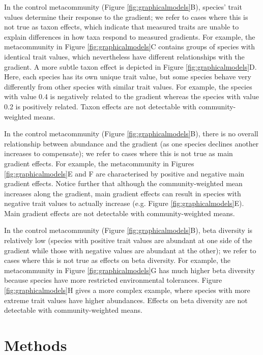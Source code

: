 \documentclass[12pt]{ecology}
\begin{document}
In the control metacommunity (Figure \ref{fig:graphicalmodels}B), species' trait values determine their response to the gradient; we refer to cases where this is not true as taxon effects, which indicate that measured traits are unable to explain differences in how taxa respond to measured gradients.  For example, the metacommunity in Figure \ref{fig:graphicalmodels}C contains groups of species with identical trait values, which nevertheless have different relationships with the gradient.  A more subtle taxon effect is depicted in Figure \ref{fig:graphicalmodels}D.  Here, each species has its own unique trait value, but some species behave very differently from other species with similar trait values.  For example, the species with value 0.4 is negatively related to the gradient whereas the species with value 0.2 is positively related.  Taxon effects are not detectable with community-weighted means.

In the control metacommunity (Figure \ref{fig:graphicalmodels}B), there is no overall relationship between abundance and the gradient (as one species declines another increases to compensate); we refer to cases where this is not true as main gradient effects.  For example, the metacommunity in Figures \ref{fig:graphicalmodels}E and F are characterised by positive and negative main gradient effects.  Notice further that although the community-weighted mean increases along the gradient, main gradient effects can result in species with negative trait values to actually increase (e.g. Figure \ref{fig:graphicalmodels}E).  Main gradient effects are not detectable with community-weighted means.

In the control metacommunity (Figure \ref{fig:graphicalmodels}B), beta diversity is relatively low (species with positive trait values are abundant at one side of the gradient while those with negative values are abundant at the other); we refer to cases where this is not true as effects on beta diversity.  For example, the metacommunity in Figure \ref{fig:graphicalmodels}G has much higher beta diversity because species have more restricted environmental tolerances.  Figure \ref{fig:graphicalmodels}H gives a more complex example, where species with more extreme trait values have higher abundances.  Effects on beta diversity are not detectable with community-weighted means.

\section{Methods}
\end{document}
